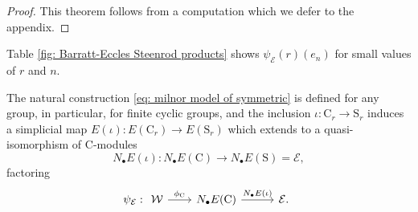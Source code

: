 \begin{proof}
	This theorem follows from a computation which we defer to the appendix.
\end{proof}

\begin{example}
	Table \ref{fig: Barratt-Eccles Steenrod products} shows $\psi_{\mathcal E}(r)(e_n)$ for small values of $r$ and $n$.
\end{example}

\begin{table}[h]
	\centering
	\vspace*{3pt}
	\caption{The elements $\psi_{\mathcal E}(r)(e_n)$ for small values of $r$ and $n$ where we are denoting $(\rho^{r_0}, \dots, \rho^{r_n})$ simply by $(r_0, \dots, r_n)$.}
	\label{fig: Barratt-Eccles Steenrod products}
\end{table}

\begin{remark}
	The natural construction \eqref{eq: milnor model of symmetric} is defined for any group, in particular, for finite cyclic groups, and the inclusion $\iota : \mathrm C_r \to \mathrm S_r$ induces a simplicial map $E(\iota) \colon E(\mathrm C_r) \to E(\mathrm S_r)$ which extends to a quasi-isomorphism of $\mathrm C$-modules
	\begin{equation*}
	N_\bullet E(\iota) : N_\bullet E(\mathrm C) \to N_\bullet E(\mathrm S) = \mathcal E,
	\end{equation*}
	factoring
	\begin{equation*}
	\psi_{\mathcal E} :
	\begin{tikzcd}
	\mathcal W \arrow[r, "\phi_{\mathrm C}"] &[-3pt] N_\bullet E(\mathrm C) \arrow[r, "N_\bullet E(\iota)"] &[5pt] \mathcal E.
	\end{tikzcd}
	\end{equation*}
\end{remark}

